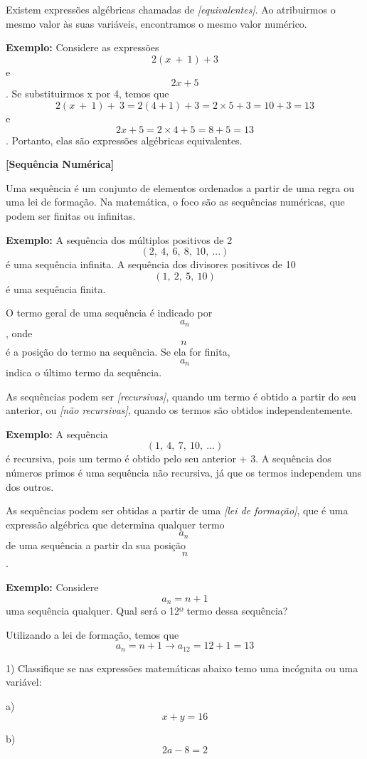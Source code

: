 Existem expressões algébricas chamadas de \emph{{[}equivalentes{]}}. Ao
atribuirmos o mesmo valor às suas variáveis, encontramos o mesmo valor
numérico.

\textbf{Exemplo:} Considere as expressões \[2(x\  + \ 1) + 3\] e
\[2x + 5\]. Se substituirmos x por 4, temos que
\[2\left( x\  + \ 1 \right) + \ 3 = 2\left( 4 + 1 \right) + 3 = 2 \times 5 + 3 = 10 + 3 = 13\]
e \[2x + 5 = 2 \times 4 + 5 = 8 + 5 = 13\]. Portanto, elas são
expressões algébricas equivalentes.

\textbf{{[}Sequência Numérica{]}}

Uma sequência é um conjunto de elementos ordenados a partir de uma regra
ou uma lei de formação. Na matemática, o foco são as sequências
numéricas, que podem ser finitas ou infinitas.

\textbf{Exemplo:} A sequência dos múltiplos positivos de 2
\[(2,\ 4,\ 6,\ 8,\ 10,\ ...)\] é uma sequência infinita. A sequência dos
divisores positivos de 10 \[(1,\ 2,\ 5,\ 10)\] é uma sequência finita.

O termo geral de uma sequência é indicado por \[a_{n}\], onde \[n\ \] é
a posição do termo na sequência. Se ela for finita, \[a_{n}\] indica o
último termo da sequência.

As sequências podem ser \emph{{[}recursivas{]}}, quando um termo é
obtido a partir do seu anterior, ou \emph{{[}não recursivas{]}}, quando
os termos são obtidos independentemente.

\textbf{Exemplo:} A sequência \[(1,\ 4,\ 7,\ 10,\ ...)\] é recursiva,
pois um termo é obtido pelo seu anterior + 3. A sequência dos números
primos é uma sequência não recursiva, já que os termos independem uns
dos outros.

As sequências podem ser obtidas a partir de uma \emph{{[}lei de
formação{]}}, que é uma expressão algébrica que determina qualquer termo
\[a_{n}\ \] de uma sequência a partir da sua posição \[n\].

\textbf{Exemplo:} Considere \[a_{n} = n + 1\] uma sequência qualquer.
Qual será o 12º termo dessa sequência?

Utilizando a lei de formação, temos que
\[a_{n} = n + 1 \rightarrow a_{12} = 12 + 1 = 13\]


1) Classifique se nas expressões matemáticas abaixo temo uma incógnita
ou uma variável:

a) \[x + y = 16\]

b) \[2a - 8 = 2\]

